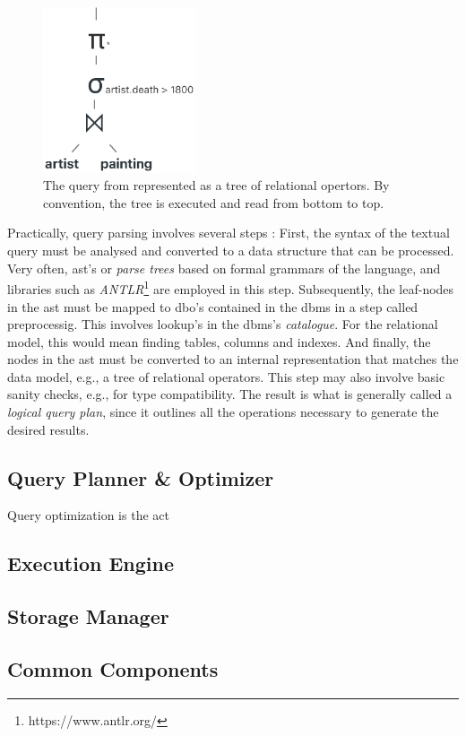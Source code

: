 \begin{figure}[tb]
    \centering
    \includegraphics[width=0.4\textwidth]{figures/query-tree.eps}
    \caption{The query from  represented as a tree of relational opertors. By convention, the tree is executed and read from bottom to top.}
    \label{figure:query-tree}
\end{figure}

Practically, query parsing involves several steps \cite{Garcia:2009Database}: First, the syntax of the textual query must be analysed and converted to a data structure that can be processed. Very often, \acrfull{ast}'s or \emph{parse trees} based on formal grammars of the language, and libraries such as \emph{ANTLR}\footnote{https://www.antlr.org/} are employed in this step. Subsequently, the leaf-nodes in the \acrshort{ast} must be mapped to \acrfull{dbo}'s contained in the \acrshort{dbms} in a step called preprocessig. This involves lookup's in the \acrshort{dbms}'s \emph{catalogue}. For the relational model, this would mean finding tables, columns and indexes. And finally, the nodes in the \acrshort{ast} must be converted to an internal representation that matches the data model, e.g., a tree of relational operators. This step may also involve basic sanity checks, e.g., for type compatibility. The result is what is generally called a \emph{logical query plan}, since it outlines all the operations necessary to generate the desired results.

\subsection{Query Planner \& Optimizer}

Query optimization is the act
\subsection{Execution Engine}

\subsection{Storage Manager}


\subsection{Common Components}